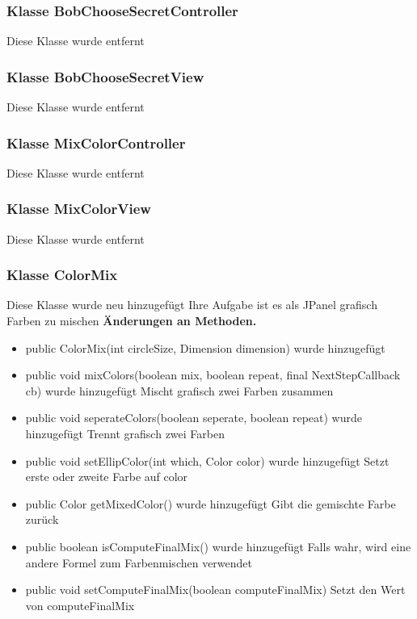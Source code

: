 \documentclass{article}
\begin{document}
	\subsubsection{Klasse BobChooseSecretController}
    Diese Klasse wurde entfernt

	\subsubsection{Klasse BobChooseSecretView}
    Diese Klasse wurde entfernt

	\subsubsection{Klasse MixColorController}
    Diese Klasse wurde entfernt

	\subsubsection{Klasse MixColorView}
    Diese Klasse wurde entfernt

	\subsubsection{Klasse ColorMix}
    Diese Klasse wurde neu hinzugefügt
    Ihre Aufgabe ist es als JPanel grafisch Farben zu mischen
    \textbf{Änderungen an Methoden.}\newline
	   \begin{itemize}
           \item public ColorMix(int circleSize, Dimension dimension) wurde hinzugefügt\newline
           \item public void mixColors(boolean mix, boolean repeat, final NextStepCallback cb) wurde hinzugefügt\newline
               Mischt grafisch zwei Farben zusammen
           \item public void seperateColors(boolean seperate, boolean repeat) wurde hinzugefügt\newline
               Trennt grafisch zwei Farben
           \item public void setEllipColor(int which, Color color) wurde hinzugefügt\newline
               Setzt erste oder zweite Farbe auf color
           \item public Color getMixedColor() wurde hinzugefügt\newline
               Gibt die gemischte Farbe zurück
           \item public boolean isComputeFinalMix() wurde hinzugefügt\newline
               Falls wahr, wird eine andere Formel zum Farbenmischen verwendet
           \item public void setComputeFinalMix(boolean computeFinalMix)\newline
               Setzt den Wert von computeFinalMix
           \end{itemize}
\end{document}
